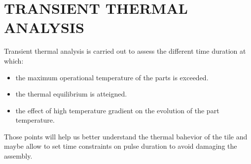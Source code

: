 \section{TRANSIENT THERMAL ANALYSIS}
\normalsize{Transient thermal analysis is carried out to assess the different time duration at which:
\begin{itemize}
    \item the maximum operational temperature of the parts is exceeded.
    \item the thermal equilibrium is atteigned.
    \item the effect of high temperature gradient on the evolution of the part temperature.
\end{itemize}
Those points will help us better understand the thermal bahevior of the tile and maybe allow to set time constraints on pulse duration to avoid damaging the assembly.}
